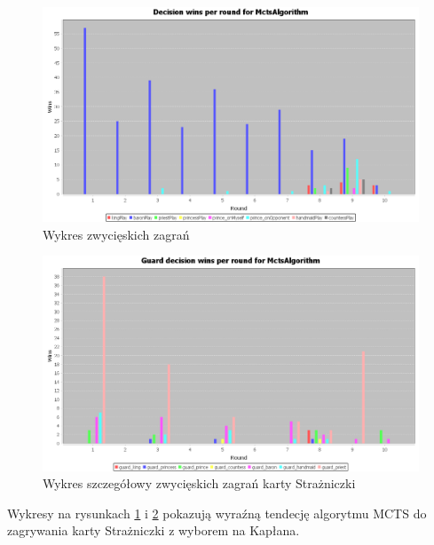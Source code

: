 \begin{figure}[H]
	\centering
	\includegraphics[width=\textwidth]{Resources/MctsVsR/MctsVsRdecision.PNG}
	\caption{Wykres zwycięskich zagrań} 
	\label{fig:MctsVsRdecision}
\end{figure} 

\begin{figure}[H]
	\centering
	\includegraphics[width=\textwidth]{Resources/MctsVsR/MctsVsRguarddecision.PNG}
	\caption{Wykres szczegółowy zwycięskich zagrań karty Strażniczki} 
	\label{fig:MctsVsRguarddecision}
\end{figure}

Wykresy na rysunkach \ref{fig:MctsVsRdecision} i \ref{fig:MctsVsRguarddecision} pokazują wyraźną tendecję algorytmu MCTS do zagrywania karty Strażniczki z wyborem na Kapłana.


